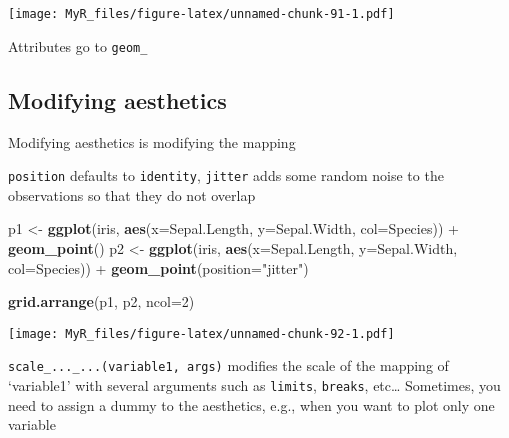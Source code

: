 \documentclass[]{book}
\newenvironment{Shaded}{}{}
\newcommand{\DataTypeTok}[1]{\textcolor[rgb]{0.56,0.13,0.00}{#1}}
\newcommand{\DecValTok}[1]{\textcolor[rgb]{0.25,0.63,0.44}{#1}}
\newcommand{\KeywordTok}[1]{\textcolor[rgb]{0.00,0.44,0.13}{\textbf{#1}}}
\newcommand{\NormalTok}[1]{#1}
\newcommand{\OperatorTok}[1]{\textcolor[rgb]{0.40,0.40,0.40}{#1}}
\newcommand{\StringTok}[1]{\textcolor[rgb]{0.25,0.44,0.63}{#1}}
\theoremstyle{definition}
\theoremstyle{definition}
\theoremstyle{definition}
\theoremstyle{remark}
\begin{document}
\texttt{[image: MyR\_files/figure-latex/unnamed-chunk-91-1.pdf]}

Attributes go to \texttt{geom\_}

\hypertarget{modifying-aesthetics}{%
\subsection{Modifying aesthetics}\label{modifying-aesthetics}}

Modifying aesthetics is modifying the mapping

\texttt{position} defaults to \texttt{identity}, \texttt{jitter} adds
some random noise to the observations so that they do not overlap

\begin{Shaded}
\begin{Highlighting}[]

\NormalTok{p1 <-}\StringTok{ }\KeywordTok{ggplot}\NormalTok{(iris, }\KeywordTok{aes}\NormalTok{(}\DataTypeTok{x=}\NormalTok{Sepal.Length, }\DataTypeTok{y=}\NormalTok{Sepal.Width, }\DataTypeTok{col=}\NormalTok{Species)) }\OperatorTok{+}
\StringTok{      }\KeywordTok{geom_point}\NormalTok{()}
\NormalTok{p2 <-}\StringTok{ }\KeywordTok{ggplot}\NormalTok{(iris, }\KeywordTok{aes}\NormalTok{(}\DataTypeTok{x=}\NormalTok{Sepal.Length, }\DataTypeTok{y=}\NormalTok{Sepal.Width, }\DataTypeTok{col=}\NormalTok{Species)) }\OperatorTok{+}
\StringTok{      }\KeywordTok{geom_point}\NormalTok{(}\DataTypeTok{position=}\StringTok{"jitter"}\NormalTok{)}

\KeywordTok{grid.arrange}\NormalTok{(p1, p2,  }\DataTypeTok{ncol=}\DecValTok{2}\NormalTok{)}
\end{Highlighting}
\end{Shaded}

\texttt{[image: MyR\_files/figure-latex/unnamed-chunk-92-1.pdf]}

\texttt{scale\_...\_...(variable1,\ args)} modifies the scale of the
mapping of `variable1' with several arguments such as \texttt{limits},
\texttt{breaks}, etc\ldots{} Sometimes, you need to assign a dummy to
the aesthetics, e.g., when you want to plot only one variable

\begin{Shaded}
\end{Shaded}
\end{document}
